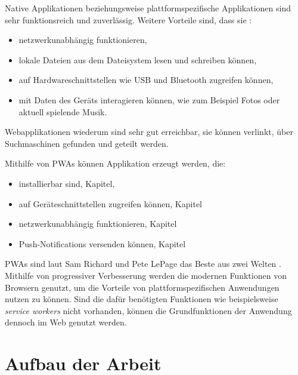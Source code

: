 Native Applikationen beziehungsweise plattformspezifische Applikationen sind sehr funktionsreich und zuverlässig. Weitere Vorteile sind, dass sie : 
\begin{itemize}
    \item  netzwerkunabhängig funktionieren,
    \item  lokale Dateien aus dem Dateisystem lesen und schreiben können, 
    \item  auf Hardwareschnittstellen wie USB und Bluetooth zugreifen können, 
    \item  mit Daten des Geräts interagieren können, wie zum Beispiel Fotos oder aktuell spielende Musik. 
\end{itemize}

Webapplikationen wiederum sind sehr gut erreichbar, sie können verlinkt, über Suchmaschinen gefunden und geteilt werden. 

Mithilfe von PWAs können Applikation erzeugt werden, die: 
\begin{itemize}
    \item installierbar sind, Kapitel, 
    \item auf Geräteschnittstellen zugreifen können, Kapitel 
    \item netzwerkunabhängig funktionieren, Kapitel
    \item Push-Notifications versenden können, Kapitel
\end{itemize}

PWAs sind laut Sam Richard und Pete LePage das Beste aus zwei Welten \cite{SamRichard2020}. Mithilfe von progressiver Verbesserung werden die modernen Funktionen von Browsern genutzt, um die Vorteile von plattformspezifischen Anwendungen nutzen zu können. Sind die dafür benötigten Funktionen wie beispielsweise \textit{service workers} nicht vorhanden, können die Grundfunktionen der Anwendung dennoch im Web genutzt werden. 

\section{Aufbau der Arbeit}\label{se:AufbauDerArbeit}
